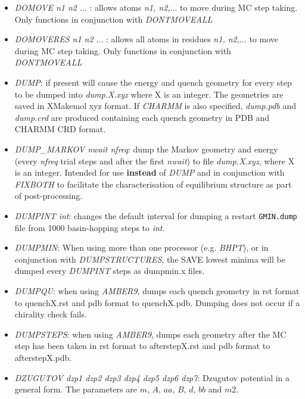 \documentclass[12pt,a4paper,dvips]{article}
\begin{document}
\begin{itemize}
\item {\it DOMOVE n1 n2 $\ldots$ \/}: allows atoms {\it n1, n2,$\ldots$} to move during MC step taking. Only functions in conjunction with 
{\it DONTMOVEALL\/}

\item {\it DOMOVERES n1 n2 $\ldots$ \/}: allows all atoms in residues {\it n1, n2,$\ldots$} to move during MC step taking. Only functions in conjunction 
with {\it DONTMOVEALL\/}

\item {\it DUMP\/}: if present will cause the energy and quench geometry for every step
to be dumped into {\it dump.X.xyz\/} where X is an integer. The geometries are saved 
in XMakemol xyz format. If {\it CHARMM\/} is also specified, {\it dump.pdb\/} and {\it dump.crd\/}
are produced containing each quench geometry in PDB and CHARMM CRD format.

\item {\it DUMP\_MARKOV nwait nfreq\/}: dump the Markov geometry and
energy (every {\it nfreq\/} trial steps and after the first {\it nwait\/}) to file {\it dump.X.xyz\/}, where X is an integer. Intended for use {\bf instead\/} of {\it DUMP\/} and in conjunction with {\it FIXBOTH\/} to facilitate the characterisation of equilibrium structure as part of post-processing.

\item {\it DUMPINT int\/}: changes the default interval for dumping a restart 
{\tt GMIN.dump} file from 1000 basin-hopping steps to {\it int\/}.

\item {\it DUMPMIN\/}: When using more than one processor (e.g. {\it BHPT\/}), or in conjunction with {\it DUMPSTRUCTURES\/}, the SAVE lowest minima will be dumped every 
{\it DUMPINT\/} steps as dumpmin.x files. 

\item {\it DUMPQU\/}: when using {\it AMBER9\/}, dumps each quench geometry in rst format to quenchX.rst 
and pdb format to quenchX.pdb. Dumping does not occur if a chirality check fails.

\item {\it DUMPSTEPS\/}: when using {\it AMBER9\/}, dumps each geometry after the MC step has been taken in rst format to afterstepX.rst 
and pdb format to afterstepX.pdb. 

\item {\it DZUGUTOV dzp1 dzp2 dzp3 dzp4 dzp5 dzp6 dzp7\/}: Dzugutov potential in a general form.
The parameters are $m$, $A$, $aa$, $B$, $d$, $bb$ and $m2$.


\end{itemize}
\end{document}
